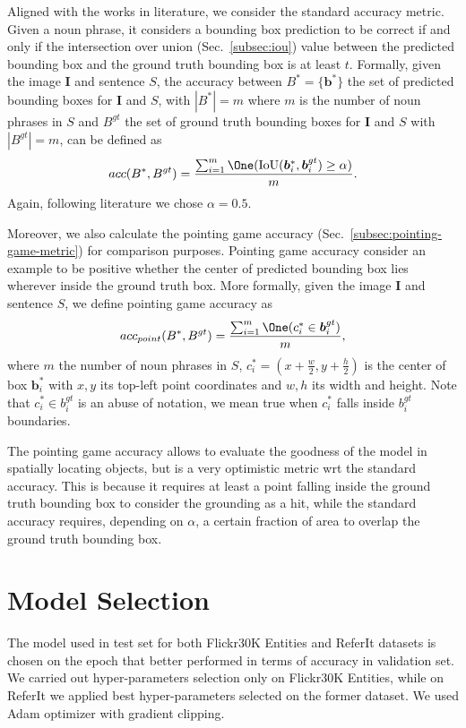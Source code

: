 Aligned with the works in literature, we consider the standard
accuracy metric. Given a noun phrase, it considers a bounding box
prediction to be correct if and only if the intersection over union
(Sec.~\ref{subsec:iou}) value between the predicted bounding box and
the ground truth bounding box is at least $t$. Formally, given the
image $\bm{I}$ and sentence $S$, the accuracy between $B^* = \{
\bm{b}^* \}$ the set of predicted bounding boxes for $\bm{I}$ and $S$,
with $|B^*| = m$ where $m$ is the number of noun phrases in $S$ and
$B^{gt}$ the set of ground truth bounding boxes for $\bm{I}$ and $S$
with $|B^{gt}| = m$, can be defined as
\[
  acc(B^*, B^{gt}) = \frac{\sum_{i = 1}^{m} \One (\iou (\bm{b}_i^*, \bm{b}_i^{gt}) \geq \alpha)}{m}.
\]
Again, following literature we chose $\alpha = 0.5$.

Moreover, we also calculate the pointing game accuracy
(Sec.~\ref{subsec:pointing-game-metric}) for comparison purposes.
Pointing game accuracy consider an example to be positive whether the
center of predicted bounding box lies wherever inside the ground truth
box. More formally, given the image $\bm{I}$ and sentence $S$, we
define pointing game accuracy as 
\[
  acc_{point}(B^*, B^{gt}) = \frac{\sum_{i = 1}^{m} \One (c_i^* \in  \bm{b}_i^{gt})}{m},
\]
where $m$ the number of noun phrases in $S$, $c^*_i = (x +
\frac{w}{2}, y + \frac{h}{2})$ is the center of box $\bm{b}^*_i$ with
$x, y$ its top-left point coordinates and $w, h$ its width and height.
Note that $c^*_i \in b^{gt}_i$ is an abuse of notation, we mean true
when $c^*_i$ falls inside $b^{gt}_i$ boundaries.

The pointing game accuracy allows to evaluate the goodness of the
model in spatially locating objects, but is a very optimistic metric
wrt the standard accuracy. This is because it requires at least a
point falling inside the ground truth bounding box to consider the
grounding as a hit, while the standard accuracy requires, depending on
$\alpha$, a certain fraction of area to overlap the ground truth
bounding box.

\section{Model Selection}

The model used in test set for both Flickr30K Entities and ReferIt
datasets is chosen on the epoch that better performed in terms of
accuracy in validation set. We carried out hyper-parameters selection
only on Flickr30K Entities, while on ReferIt we applied best
hyper-parameters selected on the former dataset. We used Adam
optimizer with gradient clipping.

